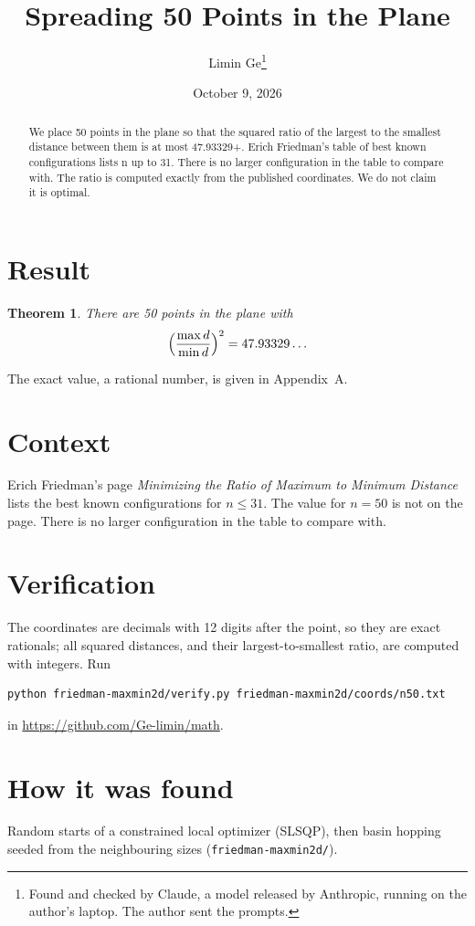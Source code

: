 \documentclass[11pt,a4paper]{article}
\title{Spreading 50 Points in the Plane}
\author{Limin Ge\thanks{Found and checked by Claude, a model released by Anthropic, running on the author's laptop. The author sent the prompts.}}
\date{October 9, 2026}
\newtheorem*{theorem}{Theorem}
\begin{document}
\maketitle
\begin{abstract}
We place 50 points in the plane so that the squared ratio of the largest to the smallest distance between them is at most 47.93329+. Erich Friedman's table of best known configurations lists n up to 31. There is no larger configuration in the table to compare with. The ratio is computed exactly from the published coordinates. We do not claim it is optimal.
\end{abstract}

\section{Result}
\begin{theorem}
There are 50 points in the plane with
\[ \Bigl(\frac{\max d}{\min d}\Bigr)^2 = 47.93329\ldots \]
\end{theorem}
The exact value, a rational number, is given in Appendix~A.


\section{Context}
Erich Friedman's page \emph{Minimizing the Ratio of Maximum to Minimum Distance} lists the best known configurations for $n\le 31$. The value for $n=50$ is not on the page. There is no larger configuration in the table to compare with.


\section{Verification}
The coordinates are decimals with 12 digits after the point, so they are exact rationals; all squared distances, and their largest-to-smallest ratio, are computed with integers. Run
\begin{verbatim}
python friedman-maxmin2d/verify.py friedman-maxmin2d/coords/n50.txt
\end{verbatim}
in \url{https://github.com/Ge-limin/math}.


\section{How it was found}
Random starts of a constrained local optimizer (SLSQP), then basin hopping seeded from the neighbouring sizes (\texttt{friedman-maxmin2d/}).
\end{document}
